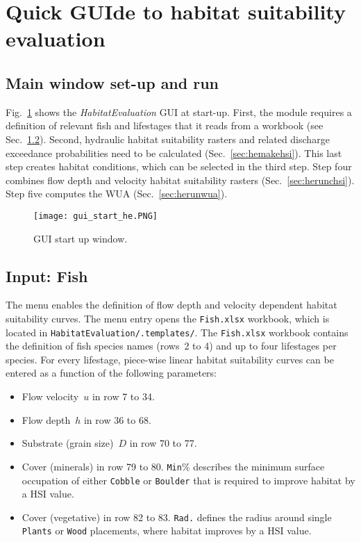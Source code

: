\section{Quick GUIde to habitat suitability evaluation} \label{sec:hequick}
\subsection{Main window set-up and run} 
Fig.~\ref{fig:gui_start_he} shows the \textit{HabitatEvaluation} GUI at start-up. First, the module requires a definition of relevant fish and lifestages that it reads from a workbook (see Sec.~\ref{sec:hefish}). Second, hydraulic habitat suitability rasters and related discharge exceedance probabilities need to be calculated (Sec.~\ref{sec:hemakehsi}). This last step creates habitat conditions, which can be selected in the third step. Step four combines flow depth and velocity habitat suitability rasters (Sec.~\ref{sec:herunchsi}). Step five computes the WUA (Sec.~\ref{sec:herunwua}).
 
 
\begin{figure}[hbt]
	\begin{center}
	\texttt{[image: gui\_start\_he.PNG]} %
	\caption{GUI start up window. \label{fig:gui_start_he}}
	\end{center}
\end{figure}


\subsection{Input: Fish} \label{sec:hefish}
The  menu enables the definition of flow depth and velocity dependent habitat suitability curves. The  menu entry opens the \texttt{Fish.xlsx} workbook, which is located in \texttt{HabitatEvaluation/.templates/}. The \texttt{Fish.xlsx} workbook contains the definition of fish species names (rows~2 to 4) and up to four lifestages per species. For every lifestage, piece-wise linear habitat suitability curves can be entered as a function of the following parameters:
\begin{itemize}
  \item Flow velocity~$u$ in row 7 to 34.
  \item Flow depth~$h$ in row 36 to 68.
  \item Substrate (grain size)~$D$ in row 70 to 77.
  \item Cover (minerals) in row 79 to 80. \texttt{Min}$\%$ describes the minimum surface occupation of either \texttt{Cobble} or \texttt{Boulder} that is required to improve habitat by a HSI value.
  \item Cover (vegetative) in row 82 to 83. \texttt{Rad.} defines the radius around single \texttt{Plants} or \texttt{Wood} placements, where habitat improves by a HSI value.
\end{itemize}

